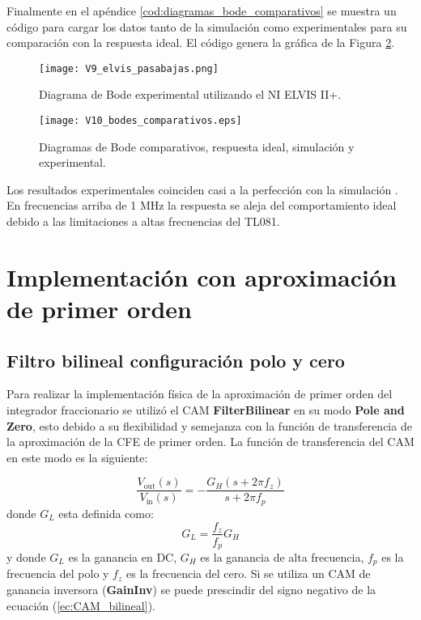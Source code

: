 	Finalmente en el apéndice \ref{cod:diagramas_bode_comparativos} se muestra un código para cargar los datos tanto de la simulación como experimentales para su comparación con la respuesta ideal. El código genera la gráfica de la Figura \ref{fig:V10_bodes_comparativos}. 
	
	\begin{figure}[h!]
		\caption{Diagrama de Bode experimental utilizando el NI ELVIS II+.}
		\label{fig:V9_elvis_pasabajas}
		\centering
		\texttt{[image: V9\_elvis\_pasabajas.png]}
	\end{figure}
	
	\begin{figure}[h!]
		\caption{Diagramas de Bode comparativos, respuesta ideal, simulación y experimental.}
		\label{fig:V10_bodes_comparativos}
		\centering
		\texttt{[image: V10\_bodes\_comparativos.eps]}
	\end{figure}
	Los resultados experimentales coinciden casi a la perfección con la simulación . En frecuencias arriba de 1 MHz la respuesta se aleja del comportamiento ideal debido a las limitaciones a altas frecuencias del TL081.
	
	\section{Implementación con aproximación de primer orden}
	
		\subsection{Filtro bilineal configuración polo y cero}
	
	Para realizar la implementación física de la aproximación de primer orden del integrador fraccionario se utilizó el CAM \textbf{FilterBilinear} en su modo \textbf{Pole and Zero}, esto debido a su flexibilidad y semejanza con la función de transferencia de la aproximación de la CFE de primer orden. La función de transferencia del CAM en este modo es la siguiente:
	
	\begin{equation}
		\frac{V_{\mathrm{out}} (s)}{V_{\mathrm{in}}(s)} = -\frac{G_{H} (s + 2 \pi f_{z})}{s + 2 \pi f_{p}}
		\label{ec:CAM_bilineal}
	\end{equation}
	donde $G_{L}$ esta definida como:
	\begin{equation}
		G_{L} = \frac{f_{z}}{f_{p}} G_{H}
	\end{equation}
	y donde $G_{L}$ es la ganancia en DC, $G_{H}$ es la ganancia de alta frecuencia, $f_{p}$ es la frecuencia del polo y $f_{z}$ es la frecuencia del cero. Si se utiliza un CAM de ganancia inversora (\textbf{GainInv}) se puede prescindir del signo negativo de la ecuación (\ref{ec:CAM_bilineal}).
	
